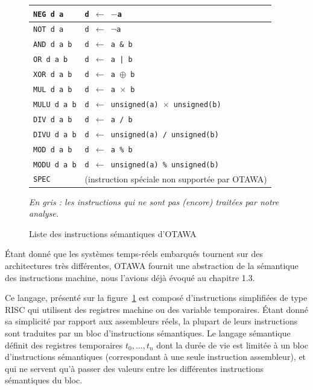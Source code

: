 \documentclass[french]{article}
\begin{document}
\begin{figure}
\begin{tabular}{|l|l|}
      \texttt{NEG d a} & \texttt{d $\leftarrow$ $-$a}\\ \hline
      \rowcolor{Gray} \texttt{NOT d a} & \texttt{d $\leftarrow$ $\neg$a}\\ \hline
      \rowcolor{Gray} \texttt{AND d a b} & \texttt{d $\leftarrow$ a \& b}\\ \hline
      \rowcolor{Gray} \texttt{OR d a b} & \texttt{d $\leftarrow$ a | b}\\ \hline
      \rowcolor{Gray} \texttt{XOR d a b} & \texttt{d $\leftarrow$ a $\oplus$ b}\\ \hline
      \texttt{MUL d a b} & \texttt{d $\leftarrow$ a $\times$ b}\\ \hline
      \rowcolor{Gray} \texttt{MULU d a b} & \texttt{d $\leftarrow$ unsigned(a) $\times$ unsigned(b)}\\ \hline
      \texttt{DIV d a b} & \texttt{d $\leftarrow$ a / b}\\ \hline
      \rowcolor{Gray} \texttt{DIVU d a b} & \texttt{d $\leftarrow$ unsigned(a) / unsigned(b)}\\ \hline
      \texttt{MOD d a b} & \texttt{d $\leftarrow$ a \% b}\\ \hline
      \rowcolor{Gray} \texttt{MODU d a b} & \texttt{d $\leftarrow$ unsigned(a) \% unsigned(b)}\\ \hline
      \rowcolor{Gray} \texttt{SPEC} & (instruction spéciale non supportée par OTAWA)\\ \hline
    \end{tabular}
    \textit{En gris : les instructions qui ne sont pas (encore) traitées par notre analyse.}
    \label{seminsts}
    \caption{Liste des instructions sémantiques d'OTAWA}
  \end{figure}

  \'Etant donné que les systèmes temps-réels embarqués tournent sur des architectures très différentes, OTAWA fournit une abstraction de la sémantique des instructions machine, nous l'avions déjà évoqué au chapitre 1.3. %

  Ce langage, présenté sur la figure~\ref{seminsts} est composé d'instructions simplifiées de type RISC qui utilisent des registres machine ou des variable temporaires. \'Etant donné sa simplicité par rapport aux assembleurs réels, la plupart de leurs instructions sont traduites par un bloc d'instructions sémantiques. Le langage sémantique définit des registres temporaires $t_0, ..., t_n$ dont la durée de vie est limitée à un bloc d'instructions sémantiques (correspondant à une seule instruction assembleur), et qui ne servent qu'à passer des valeurs entre les différentes instructions sémantiques du bloc.
\end{document}
